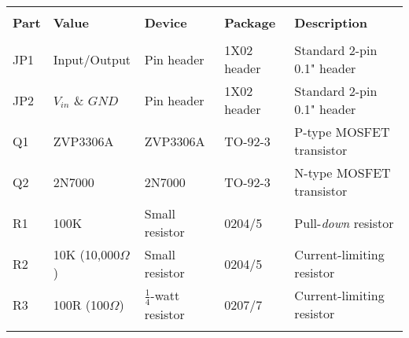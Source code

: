 \begin{tabular}{lllll}
\hline\\[\negsep]
\textbf{Part} & \textbf{Value} & \textbf{Device} & \textbf{Package} & \textbf{Description} \\[\sep]
\hline\\[\negsep]
JP1  &  Input/Output & Pin header    & 1X02 header     & Standard 2-pin 0.1" header \\[\sep]
JP2  &  $V_{in}$ \& $GND$ & Pin header & 1X02 header     & Standard 2-pin 0.1" header \\[\sep]
Q1   &  ZVP3306A    & ZVP3306A       & TO-92-3     & P-type MOSFET transistor \\[\sep]
Q2   &  2N7000      & 2N7000         & TO-92-3     & N-type MOSFET transistor \\[\sep]
R1   &  100K        & Small resistor & 0204/5    & Pull-\emph{down} resistor \\[\sep]
R2   &  10K (10,000$\Omega$)         & Small resistor & 0204/5    & Current-limiting resistor \\[\sep]
R3   &  100R (100$\Omega$) & $\frac{1}{4}$-watt resistor & 0207/7 & Current-limiting resistor \\[\sep]

\hline\\
\end{tabular}
